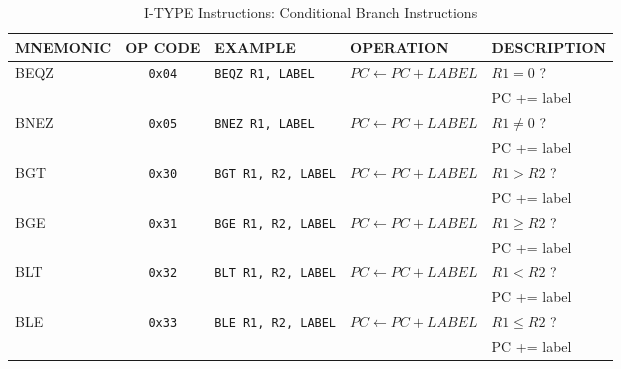\begin{table}[H]
\begin{tabularx}{\textwidth}{|l|c|l|l|X|}
    \hline
    MNEMONIC & OP CODE & EXAMPLE & OPERATION & DESCRIPTION \\ 
    \hline
    BEQZ & \texttt{0x04} & \texttt{BEQZ R1, LABEL} & $PC \leftarrow PC + LABEL$ & $R1 = 0$ ?\\ 
    & & & & PC += label\\
    \hline
    BNEZ & \texttt{0x05} & \texttt{BNEZ R1, LABEL} & $PC \leftarrow PC + LABEL$ & $R1 \neq 0$ ?\\ 
    & & & & PC += label\\
    \hline
    BGT & \texttt{0x30} & \texttt{BGT R1, R2, LABEL} & $PC \leftarrow PC + LABEL$ & $R1 > R2$ ?\\ 
    & & & & PC += label\\
    \hline
    BGE & \texttt{0x31} & \texttt{BGE R1, R2, LABEL} & $PC \leftarrow PC + LABEL$ & $R1 \ge R2$ ?\\ 
    & & & & PC += label\\
    \hline
    BLT & \texttt{0x32} & \texttt{BLT R1, R2, LABEL} & $PC \leftarrow PC + LABEL$ & $R1 < R2$ ?\\ 
    & & & & PC += label\\
    \hline
    BLE & \texttt{0x33} & \texttt{BLE R1, R2, LABEL} & $PC \leftarrow PC + LABEL$ & $R1 \le R2$ ?\\ 
    & & & & PC += label\\
    \hline
\end{tabularx}
\caption{I-TYPE Instructions: Conditional Branch Instructions}
\label{table:i_type_branch}
\end{table}